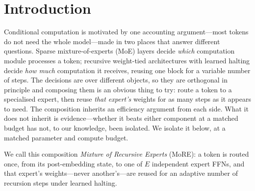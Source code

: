 \section{Introduction}
\label{sec:intro}

Conditional computation is motivated by one accounting argument---most tokens do
not need the whole model---made in two places that answer different questions.
Sparse mixture-of-experts (MoE) layers
\citep{jacobs1991moe,shazeer2017moe,fedus2022switch} decide \emph{which}
computation module processes a token; recursive weight-tied architectures with
learned halting \citep{graves2016act,dehghani2019ut,banino2021pondernet} decide
\emph{how much} computation it receives, reusing one block for a variable number
of steps. The decisions are over different objects, so they are orthogonal in
principle and composing them is an obvious thing to try: route a token to a
specialised expert, then reuse \emph{that expert's} weights for as many steps as
it appears to need. The composition inherits an efficiency argument from each
side. What it does not inherit is evidence---whether it beats either component at
a matched budget has not, to our knowledge, been isolated. We isolate it below,
at a matched parameter and compute budget.

We call this composition \emph{Mixture of Recursive Experts} (MoRE): a token is
routed once, from its post-embedding state, to one of $E$ independent expert
FFNs, and that expert's weights---never another's---are reused for an adaptive
number of recursion steps under learned halting.

